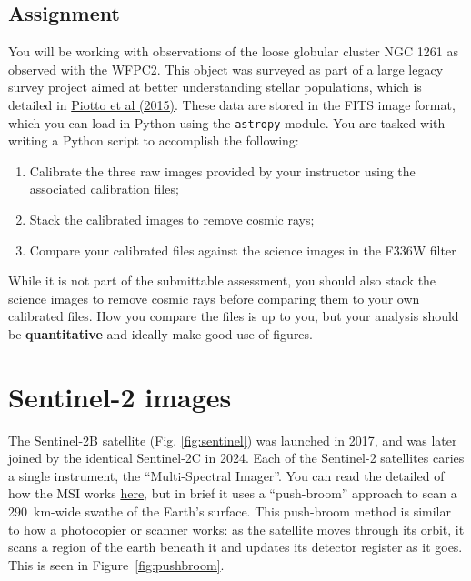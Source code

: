 \documentclass{tufte-book}
\begin{document}
\subsection{Assignment}
\begin{tcolorbox}[sharp corners=all, colback=white!75!green, title=Exercises]

You will be working with observations of the loose globular cluster NGC 1261 as observed with the WFPC2. This object was surveyed as part of a large legacy survey project aimed at better understanding stellar populations, which is detailed in \href{https://iopscience.iop.org/article/10.1088/0004-6256/149/3/91}{Piotto et al (2015)}. These data are stored in the FITS image format, which you can load in Python using the \verb|astropy| module. You are tasked with writing a Python script to accomplish the following:

\begin{enumerate}
  \item 
    Calibrate the three raw images provided by your instructor using the associated calibration files;
  \item 
    Stack the calibrated images to remove cosmic rays;
  \item 
    Compare your calibrated files against the science images in the F336W filter
\end{enumerate}

While it is not part of the submittable assessment, you should also stack the science images to remove cosmic rays before comparing them to your own calibrated files. How you compare the files is up to you, but your analysis should be \textbf{quantitative} and ideally make good use of figures.
\end{tcolorbox} 



\section{Sentinel-2 images}

The Sentinel-2B satellite (Fig. \ref{fig:sentinel}) was launched in 2017, and was later joined by the identical Sentinel-2C in 2024. Each of the Sentinel-2 satellites caries a single instrument, the ``Multi-Spectral Imager''. You can read the detailed of how the MSI works \href{https://sentiwiki.copernicus.eu/web/s2-mission#S2-Mission-MSI-Instrument}{here}, but in brief it uses a ``push-broom'' approach to scan a 290~km-wide swathe of the Earth's surface. This push-broom method is similar to how a photocopier or scanner works: as the satellite moves through its orbit, it scans a region of the earth beneath it and updates its detector register as it goes. This is seen in Figure~\ref{fig:pushbroom}.
\end{document}
